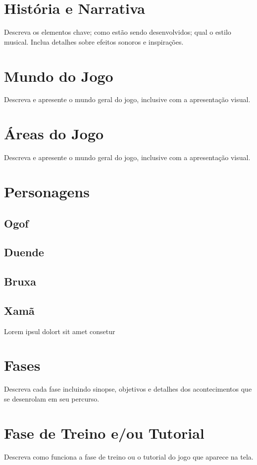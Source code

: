 
\section{História e Narrativa}

Descreva os elementos chave; como estão sendo desenvolvidos; qual o estilo musical. Inclua detalhes sobre efeitos sonoros e inspirações.

\section{Mundo do Jogo}

Descreva e apresente o mundo geral do jogo, inclusive com a apresentação visual.

\section{Áreas do Jogo}

Descreva e apresente o mundo geral do jogo, inclusive com a apresentação visual.


\section{Personagens}

\subsection{Ogof}
\subsection{Duende}
\subsection{Bruxa}
\subsection{Xamã}

Lorem ipsul dolort sit amet consetur

\section{Fases}

Descreva cada fase incluindo sinopse, objetivos e detalhes dos acontecimentos que se desenrolam em seu percurso.


\section{Fase de Treino e/ou Tutorial}

Descreva como funciona a fase de treino ou o tutorial do jogo que aparece na tela.
